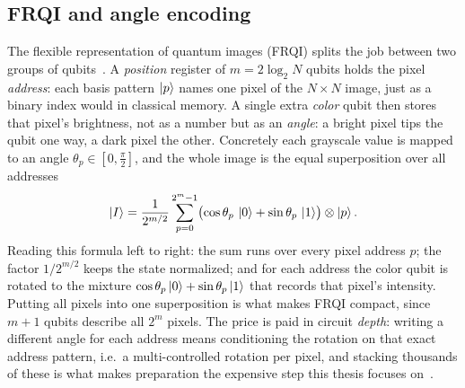 \subsection{FRQI and angle encoding}
The flexible representation of quantum images (FRQI) splits the job between two groups of qubits~\cite{Le2011FRQI}. A \emph{position} register of $m=2\log_2 N$ qubits holds the pixel \emph{address}: each basis pattern $\ket{p}$ names one pixel of the $N\times N$ image, just as a binary index would in classical memory. A single extra \emph{color} qubit then stores that pixel's brightness, not as a number but as an \emph{angle}: a bright pixel tips the qubit one way, a dark pixel the other. Concretely each grayscale value is mapped to an angle $\theta_p\in[0,\tfrac{\pi}{2}]$, and the whole image is the equal superposition over all addresses
\begin{equation}
\ket{I} = \frac{1}{2^{m/2}}\sum_{p=0}^{2^{m}-1}\bigl(\cos\theta_p\,\ket{0} + \sin\theta_p\,\ket{1}\bigr)\otimes\ket{p}.
\end{equation}
Reading this formula left to right: the sum runs over every pixel address $p$; the factor $1/2^{m/2}$ keeps the state normalized; and for each address the color qubit is rotated to the mixture $\cos\theta_p\ket{0}+\sin\theta_p\ket{1}$ that records that pixel's intensity. Putting all pixels into one superposition is what makes FRQI compact, since $m+1$ qubits describe all $2^m$ pixels. The price is paid in circuit \emph{depth}: writing a different angle for each address means conditioning the rotation on that exact address pattern, i.e.\ a multi-controlled rotation per pixel, and stacking thousands of these is what makes preparation the expensive step this thesis focuses on~\cite{Iliyasu2013FRQIroadmap}.

